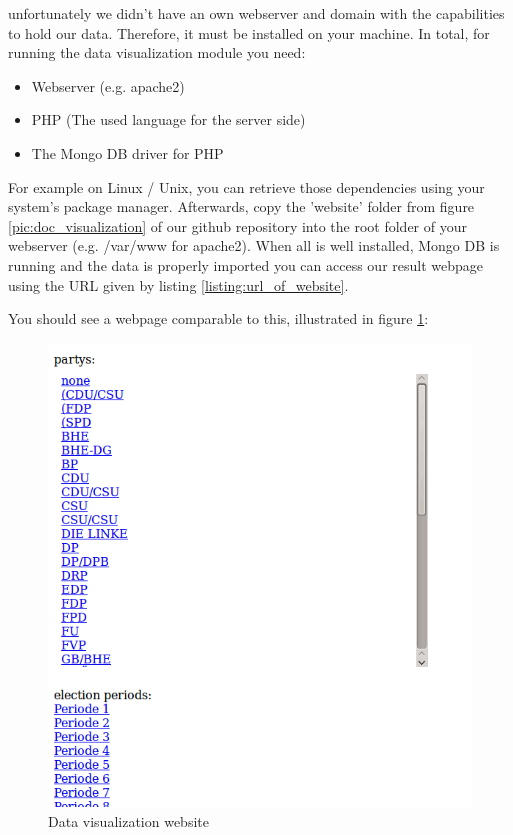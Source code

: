 \documentclass[12pt,paper=a4,nenglish]{scrreprt}
\begin{document}
unfortunately we didn't have an own webserver and domain with the capabilities
to hold our data. Therefore, it must be installed on your machine.
In total, for running the data visualization module you need:
\begin{itemize}
  \item Webserver (e.g. apache2)
  \item PHP (The used language for the server side)
  \item The Mongo DB driver for PHP
\end{itemize}
For example on Linux / Unix, you can retrieve those dependencies using your
system's package manager. Afterwards, copy the 'website' folder from figure
\ref{pic:doc_visualization} of our github repository into the root folder of
your webserver (e.g. /var/www for apache2). When all is well
installed, Mongo DB is running and the data is properly imported you can access our result webpage using the URL given by listing
\ref{listing:url_of_website}.
\begin{description}
	\centering
	
	\label{listing:url_of_website}%
\end{description}
You should see a webpage comparable to this, illustrated in figure \ref{pic:website}: 
\begin{figure}[H] 
	\centering
	\includegraphics[scale=0.4]{res/website_view.png}
	\caption{Data visualization website}%
	\label{pic:website}%
\end{figure}%
\end{document}
